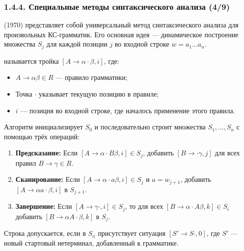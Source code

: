 \begin{frame}
\frametitle{1.4.4. Специальные методы синтаксического анализа (4/9)}
 (1970) представляет собой универсальный метод синтаксического анализа для произвольных КС-грамматик. Его основная идея — динамическое построение множества  $S_j$ для каждой позиции $j$ во входной строке $w = a_1 \dots a_n$.

 называется тройка $[A \to \alpha \cdot \beta, i]$, где:
\begin{itemize}
    \item $A \to \alpha\beta \in R$ — правило грамматики;
    \item Точка $\cdot$ указывает текущую позицию в правиле;
    \item $i$ — позиция во входной строке, где началось применение этого правила.
\end{itemize}

Алгоритм инициализирует $S_0$ и последовательно строит множества $S_1, \dots, S_n$ с помощью трёх операций:
\begin{enumerate}
    \item \textbf{Предсказание:} Если $[A \to \alpha \cdot B\beta, i] \in S_j$, добавить $[B \to \cdot \gamma, j]$ для всех правил $B \to \gamma \in R$.
    \item \textbf{Сканирование:} Если $[A \to \alpha \cdot a\beta, i] \in S_j$ и $a = w_{j+1}$, добавить $[A \to \alpha a \cdot \beta, i]$ в $S_{j+1}$.
    \item \textbf{Завершение:} Если $[A \to \gamma \cdot, i] \in S_j$, то для всех $[B \to \alpha \cdot A\beta, k] \in S_i$ добавить $[B \to \alpha A \cdot \beta, k]$ в $S_j$.
\end{enumerate}

Строка допускается, если в $S_n$ присутствует ситуация $[S' \to S \cdot, 0]$, где $S'$ — новый стартовый нетерминал, добавленный к грамматике. 
\end{frame}

